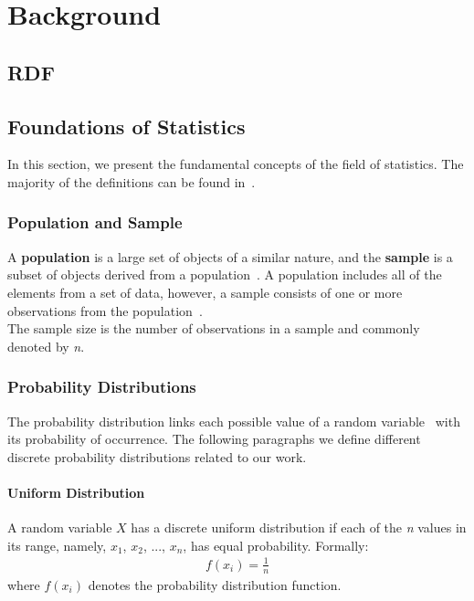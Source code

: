 
\chapter{Background}\label{chapter:background}

\section{RDF}

\section{Foundations of Statistics} \label{section:distributions}
In this section, we present the fundamental concepts of the field of statistics. The majority of the definitions can be found in~\cite{statistics_book}.

\subsection{Population and Sample}

A \textbf{population} is a large set of objects of a similar nature, and the \textbf{sample} is a subset of objects derived from a population~\cite{sample1}. A population includes all of the elements from a set of data, however, a sample consists of one or more observations from the population~\cite{sample2}.\\
The sample size is the number of observations in a sample and commonly denoted by \textit{n}.

\subsection{Probability Distributions}

The probability distribution links each possible value of a random variable~\cite{random_variable} with its probability of occurrence. The following paragraphs we define different discrete probability distributions related to our work.

\subsubsection{Uniform Distribution}

A random variable $X$ has a discrete uniform distribution if each of the \textit{n} values in
its range, namely, $x_1$, $x_2$, ..., $x_n$, has equal probability. Formally:
\begin{align}
	f(x_i) = \frac{1}{n}
\end{align}
where $f(x_i)$ denotes the probability distribution function.

